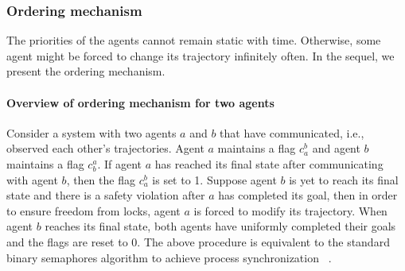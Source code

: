 \subsubsection{Ordering mechanism}
The priorities of the agents cannot remain static with time. Otherwise, some agent might be forced to change its trajectory infinitely often. 
In the sequel, we present the ordering mechanism. 

\paragraph*{Overview of ordering mechanism for two agents}

\noindent Consider a system with two agents $a$ and $b$ that have communicated, i.e., observed each other's trajectories. Agent $a$ maintains a flag $c_a^b$ and agent $b$ maintains a flag $c^a_b$. If agent $a$ has reached its final state after communicating with agent $b$, then the flag $c^b_a$ is set to 1. 
Suppose agent $b$ is yet to reach its final state and there is a safety violation after $a$ has completed its goal, then in order to ensure freedom from locks, agent $a$ is forced to modify its trajectory. When agent $b$ reaches its final state, both agents have uniformly completed their goals and the flags are reset to $0$. The above procedure is equivalent to the standard binary semaphores algorithm to achieve process synchronization ~\cite{silberschatz2018operating}. 

